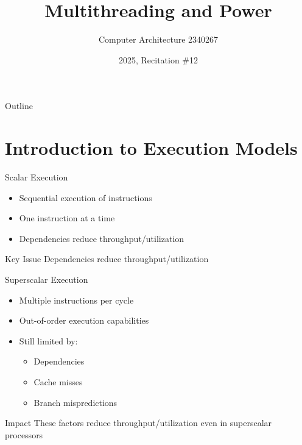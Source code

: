 \documentclass[aspectratio=169,12pt]{beamer}
\title{Multithreading and Power}
\author{Computer Architecture 2340267}
\date{2025, Recitation \#12}
\begin{document}
\frame{\titlepage}

\begin{frame}{Outline}
\tableofcontents
\end{frame}

\section{Introduction to Execution Models}

\begin{frame}{Scalar Execution}
\begin{itemize}
    \item Sequential execution of instructions
    \item One instruction at a time
    \item Dependencies reduce throughput/utilization
\end{itemize}

\vspace{0.5cm}
\begin{center}
\end{center}

\begin{alertblock}{Key Issue}
Dependencies reduce throughput/utilization
\end{alertblock}
\end{frame}

\begin{frame}{Superscalar Execution}
\begin{itemize}
    \item Multiple instructions per cycle
    \item Out-of-order execution capabilities
    \item Still limited by:
    \begin{itemize}
        \item Dependencies
        \item Cache misses
        \item Branch mispredictions
    \end{itemize}
\end{itemize}

\begin{block}{Impact}
These factors reduce throughput/utilization even in superscalar processors
\end{block}
\end{frame}
\end{document}
